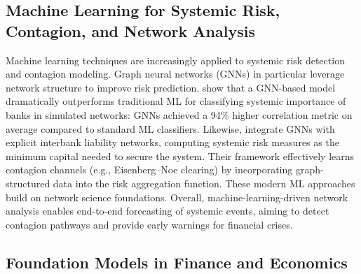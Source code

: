 \subsection{Machine Learning for Systemic Risk, Contagion, and Network Analysis}
Machine learning techniques are increasingly applied to systemic risk detection and contagion modeling.  Graph neural networks (GNNs) in particular leverage network structure to improve risk prediction.  \cite{Balmaseda2023} show that a GNN-based model dramatically outperforms traditional ML for classifying systemic importance of banks in simulated networks: GNNs achieved a 94\% higher correlation metric on average compared to standard ML classifiers.  Likewise, \cite{Gonon2024} integrate GNNs with explicit interbank liability networks, computing systemic risk measures as the minimum capital needed to secure the system.  Their framework effectively learns contagion channels (e.g., Eisenberg--Noe clearing) by incorporating graph-structured data into the risk aggregation function.  These modern ML approaches build on network science foundations.  %
Overall, machine-learning-driven network analysis enables end-to-end forecasting of systemic events, aiming to detect contagion pathways and provide early warnings for financial crises.

\subsection{Foundation Models in Finance and Economics}

